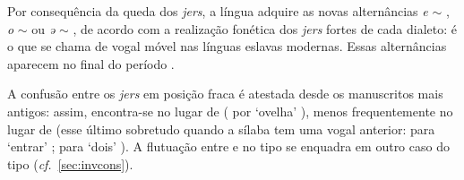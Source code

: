 Por consequência da queda dos \emph{jers}, a língua adquire as novas
alternâncias \emph{e} $\sim$ \emptyfon{}, \emph{o} $\sim$ \emptyfon{} ou \emph{ə}
$\sim$ \emptyfon{}, de acordo com a realização fonética dos \emph{jers} fortes de
cada dialeto: é o que se chama de vogal móvel nas línguas eslavas modernas.
Essas alternâncias aparecem no final do período .

A confusão entre os \emph{jers} em posição fraca é atestada desde os manuscritos
mais antigos: assim, encontra-se \grafema{\jeru} no lugar de \grafema{\jeri}
( por  `ovelha' 
), menos frequentemente \grafema{\jeri} no lugar de
\grafema{\jeru} (esse último sobretudo quando a sílaba tem uma vogal anterior:
 para  `entrar' 
;  para  `dois' 
).
A flutuação entre   e  no tipo
 se enquadra em outro caso do tipo
(\emph{cf.}~\ref{sec:invcons}).

